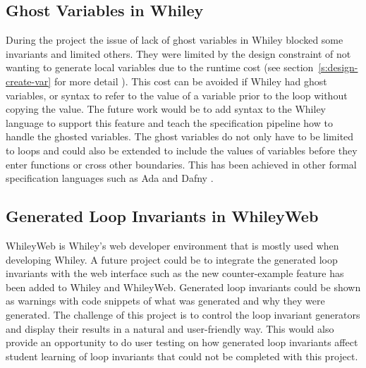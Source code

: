 \subsection{Ghost Variables in Whiley}

During the project the issue of lack of ghost variables in Whiley blocked some
invariants and limited others.
They were limited by the design constraint of not wanting to generate local
variables due to the runtime cost (see section~\ref{s:design-create-var} for
more detail ).
This cost can be avoided if Whiley had ghost variables, or syntax to refer to
the value of a variable prior to the loop without copying the value.
The future work would be to add syntax to the Whiley language to support this
feature and teach the specification pipeline how to handle the ghosted
variables.
The ghost variables do not only have to be limited to loops and could also be 
extended to include the values of variables before they enter functions or
cross other boundaries.
This has been achieved in other formal specification languages such as Ada and
Dafny \cite{dafny-lang}.

\subsection{Generated Loop Invariants in WhileyWeb}

WhileyWeb is Whiley's web developer environment that is mostly used when
developing Whiley.
A future project could be to integrate the generated loop invariants with
the web interface such as the new counter-example feature has been added to
Whiley and WhileyWeb.
Generated loop invariants could be shown as warnings with code snippets of what
was generated and why they were generated.
The challenge of this project is to control the loop invariant
generators and display their results in a natural and user-friendly way.
This would also provide an opportunity to do user testing on how generated
loop invariants affect student learning of loop invariants that could not be
completed with this project.

